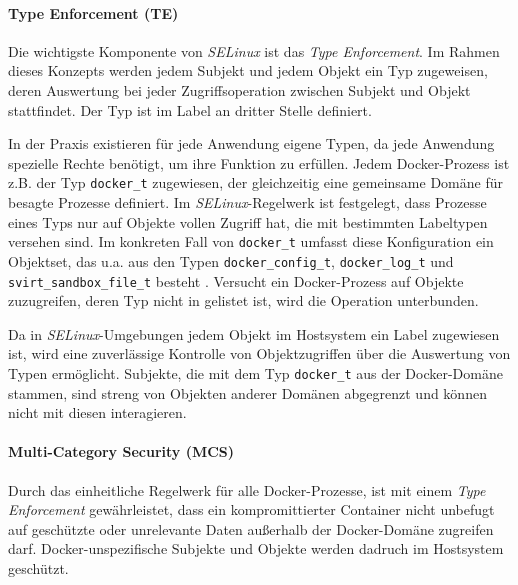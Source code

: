 \documentclass[../main.tex]{subfiles}
\begin{document}

				\paragraph{Type Enforcement (TE)}
					Die wichtigste Komponente von \emph{SELinux} ist das \emph{Type Enforcement}. Im Rahmen dieses Konzepts werden jedem Subjekt und jedem Objekt ein Typ zugeweisen, deren Auswertung bei jeder Zugriffsoperation zwischen Subjekt und Objekt stattfindet. Der Typ ist im Label an dritter Stelle definiert.

					In der Praxis existieren für jede Anwendung eigene Typen, da jede Anwendung spezielle Rechte benötigt, um ihre Funktion zu erfüllen. Jedem Docker-Prozess ist z.B. der Typ \texttt{docker\_t} zugewiesen, der gleichzeitig eine gemeinsame Domäne für besagte Prozesse definiert. Im \emph{SELinux}-Regelwerk ist festgelegt, dass Prozesse eines Typs nur auf Objekte vollen Zugriff hat, die mit bestimmten Labeltypen versehen sind. Im konkreten Fall von \texttt{docker\_t} umfasst diese Konfiguration ein Objektset, das u.a. aus den Typen \texttt{docker\_config\_t}, \texttt{docker\_log\_t} und \texttt{svirt\_sandbox\_file\_t} besteht \cite{githubSELinuxProfileTE}. Versucht ein Docker-Prozess auf Objekte zuzugreifen, deren Typ nicht in \cite{githubSELinuxProfileTE} gelistet ist, wird die Operation unterbunden.

					Da in \emph{SELinux}-Umgebungen jedem Objekt im Hostsystem ein Label zugewiesen ist, wird eine zuverlässige Kontrolle von Objektzugriffen über die Auswertung von Typen ermöglicht. Subjekte, die mit dem Typ \texttt{docker\_t} aus der Docker-Domäne stammen, sind streng von Objekten anderer Domänen abgegrenzt und können nicht mit diesen interagieren.

				\paragraph{Multi-Category Security (MCS)}
					Durch das einheitliche Regelwerk für alle Docker-Prozesse, ist mit einem \emph{Type Enforcement} gewährleistet, dass ein kompromittierter Container \cbroken{} nicht unbefugt auf geschützte oder unrelevante Daten außerhalb der Docker-Domäne  zugreifen darf. Docker-unspezifische Subjekte und Objekte werden dadruch im Hostsystem geschützt.
\end{document}
